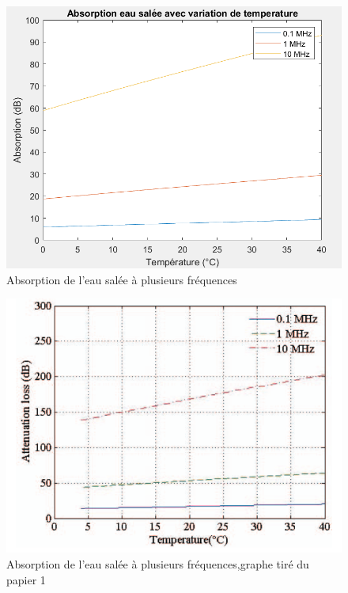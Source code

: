\documentclass{article}
\begin{document}
\begin{figure}[H]
    \caption{Absorption de l'eau salée à plusieurs fréquences}
    \includegraphics[scale=0.6]{images/freq.PNG}
    \centering
\end{figure}

\begin{figure}[H]
    \caption{Absorption de l'eau salée à plusieurs fréquences,graphe tiré du papier 1}
    \includegraphics[scale=0.6]{images/papier.PNG}
    \centering
\end{figure}

\printbibliography[title={References}]
\end{document}
